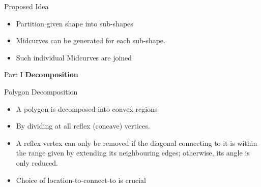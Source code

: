 
\begin{frame}{Proposed Idea}

\begin{itemize}
\item Partition given shape into sub-shapes
\item Midcurves can be generated for each sub-shape.
\item Such individual Midcurves are joined 
\end{itemize}
\end{frame}

\begin{frame}{Part I}
\centering \textbf{\Large Decomposition}
\end{frame}



\begin{frame}{Polygon Decomposition}
\begin{itemize}
\item A polygon is decomposed into convex regions 
\item By dividing at all reflex (concave) vertices.
\item A reflex vertex can only be removed if the diagonal connecting to it is within the range given by extending its neighbouring edges; otherwise, its angle is only reduced.
\item Choice of location-to-connect-to is crucial
\end{itemize}


\end{frame}



